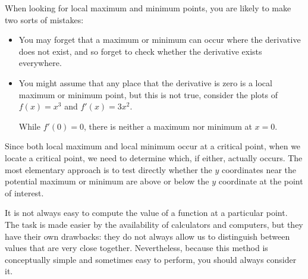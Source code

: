 \documentclass{ximera}
\begin{document}
\begin{warning} 
When looking for local maximum and minimum points, you are likely to
make two sorts of mistakes: 
\begin{itemize}
\item You may forget that a maximum or minimum can occur where the
  derivative does not exist, and so forget to check whether the
  derivative exists everywhere. 
\item You might assume that any place that the derivative is zero is a
  local maximum or minimum point, but this is not true, consider the
  plots of $f(x) = x^3$ and $f'(x) = 3x^2$.
\begin{image}
\end{image}
While $f'(0)=0$, there is neither a maximum nor minimum at $x=0$.
\end{itemize}
\end{warning}



Since both local maximum and
local minimum occur at a critical point, when we locate a critical point, we need to determine which, if either,
actually occurs. The most elementary approach is to test directly
whether the $y$ coordinates near the potential maximum or minimum are
above or below the $y$ coordinate at the point of interest. 

It is not always easy to compute the value of a function at a
particular point. The task is made easier by the availability of
calculators and computers, but they have their own drawbacks: they do
not always allow us to distinguish between values that are very close
together. Nevertheless, because this method is conceptually simple and
sometimes easy to perform, you should always consider it.
\end{document}
